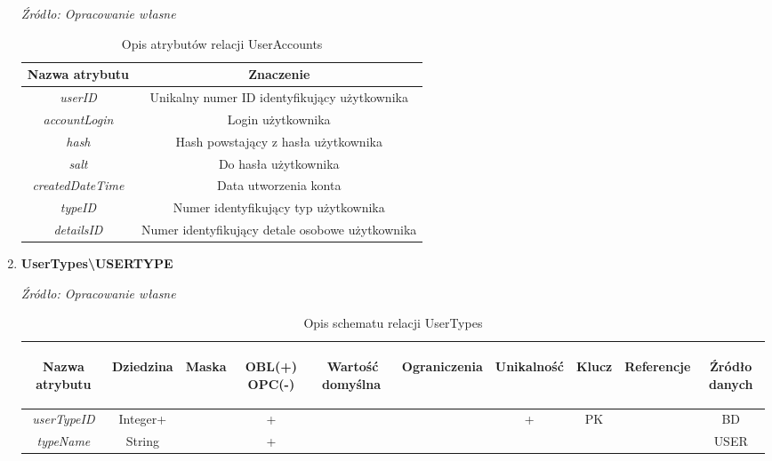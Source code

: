 \documentclass[12pt,twoside]{report}
\begin{document}
\begin{enumerate}[start=10,label={\bfseries REL\textbackslash\arabic*}]
	\begin{table}[H]
		\caption{Opis atrybutów relacji UserAccounts}
		\textit{Źródło: Opracowanie własne}
		\label{UserAccountsAttributeDescription}
		\centering
		\begin{tabular}{|c|c|}
			\hline
			Nazwa atrybutu & Znaczenie \\
			\hline
			\textit{userID}&Unikalny numer ID identyfikujący użytkownika \\	
			\hline
			\textit{accountLogin}&Login użytkownika\\	
			\hline			
			\textit{hash}&Hash powstający z hasła użytkownika\\	
			\hline			
			\textit{salt}& Do hasła użytkownika\\	
			\hline			
			\textit{createdDateTime}& Data utworzenia konta\\	
			\hline			
			\textit{typeID}&Numer identyfikujący typ użytkownika\\	
			\hline			
			\textit{detailsID}&Numer identyfikujący detale osobowe użytkownika\\	
			\hline
		\end{tabular}
	\end{table}
	\item \textbf{UserTypes\textbackslash USERTYPE}
	\begin{table}[H]
		\caption{Opis schematu relacji UserTypes}
		\textit{Źródło: Opracowanie własne}
		\label{UserTypesRelationSchema}
		\centering
		\begin{tabular}{|c|c|c|c|c|c|c|c|c|c|}
			\hline
			\begin{sideways}Nazwa atrybutu\end{sideways}& 
			\begin{sideways}Dziedzina \end{sideways}& 
			\begin{sideways}Maska \end{sideways}& 
			\begin{sideways}OBL(+) OPC(-)\end{sideways} & 
			\begin{sideways}Wartość domyślna$\ $\end{sideways}& 
			\begin{sideways}Ograniczenia\end{sideways} &
			\begin{sideways}Unikalność \end{sideways}& 
			\begin{sideways}Klucz \end{sideways}& 
			\begin{sideways}Referencje \end{sideways}&
			\begin{sideways}Źródło danych\end{sideways}\\
			\hline
			\textit{userTypeID}&Integer+&&+&&&+&PK&&BD\\	
			\hline
			\textit{typeName}&String&&+&&&&&&USER\\	
			\hline			
		\end{tabular}
	\end{table}
	

\end{enumerate}
\end{document}
